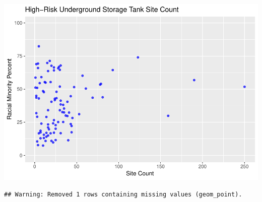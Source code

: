 \documentclass[12pt,]{article}
\begin{document}
\includegraphics{Townsend_Project_Template_files/figure-latex/final visualizations-5.pdf}

\begin{verbatim}
## Warning: Removed 1 rows containing missing values (geom_point).
\end{verbatim}
\end{document}
